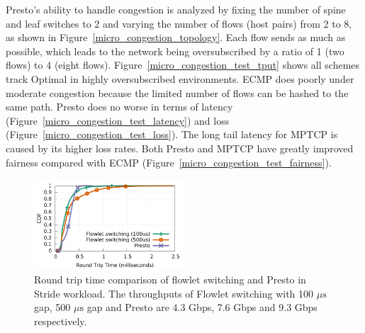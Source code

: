 Presto's ability to handle congestion is analyzed by fixing 
the number of spine and leaf switches to 2 and varying
the number of flows (host pairs) from 2 to 8, as shown
in Figure~\ref{micro_congestion_topology}. 
Each flow sends as much as possible, which leads to the network
being oversubscribed by a ratio of 1 (two flows) to 4 (eight flows).
Figure~\ref{micro_congestion_test_tput} shows all schemes track Optimal in highly
oversubscribed environments. ECMP
does poorly under moderate congestion because the limited number of flows can be hashed to the same path.
Presto does no worse in terms of latency (Figure~\ref{micro_congestion_test_latency}) and loss (Figure~\ref{micro_congestion_test_loss}).
The long tail latency for MPTCP is caused by its higher loss rates.
Both Presto and MPTCP have greatly improved fairness compared with ECMP (Figure~\ref{micro_congestion_test_fairness}).

\begin{figure}[!t]
        \centering
  \includegraphics[width=0.5\textwidth]{presto/figures/flowlets/flowlet_switching/flowlet_presto_compare_sockperf.pdf}
        \caption{Round trip time comparison of flowlet switching and Presto in Stride workload. 
		The throughputs of Flowlet switching with 100 $\mu\text{s}$ gap, 500 $\mu\text{s}$ gap and Presto 
		are 4.3 Gbps, 7.6 Gbps and 9.3 Gbps respectively. }
        \label{micro_flowlet_rtt_compare}
\end{figure}


